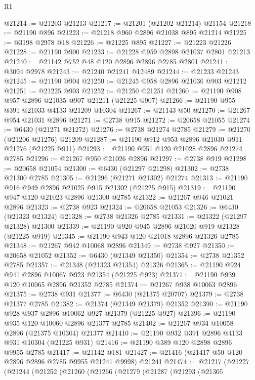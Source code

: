 \begin{lexlean}{R1}
\begin{coremodule}
@21214 := @21203 @21213
@21217 := @21201 (@21202 @21214) @21154
@21218 := @21190 @896
@21223 := @21218 @960 @2896 @21038 @895 @21214
@21225 := @3198 @2978 @18
@21226 := @21225 @895
@21227 := @21223 @21226
@21228 := @21190 @900
@21233 := @21228 @959 @2898 @21037 @2801 @21213
@21240 := @21142 @752 @48 @120 @2896 @2896 @2785 @2801
@21241 := @3094 @2978
@21243 := @21240 @21241 @12489
@21244 := @21233 @21243
@21245 := @21190 @904
@21250 := @21245 @958 @2896 @21036 @903 @21212
@21251 := @21225 @903
@21252 := @21250 @21251
@21260 := @21190 @908 @957 @2896 @21035 @907 @21211 (@21225 @907)
@21266 := @21190 @955 @391 @21033 @4133 @21209 @10304
@21267 := @21143 @50
@21270 := @21267 @954 @21031 @2896
@21271 := @2738 @915
@21272 := @20658 @21055
@21274 := @6430 (@21271 @21272)
@21276 := @2738 @21274 @2785
@21279 := @21270 (@21206 @21276) @21209
@21287 := @21190 @912 @953 @2896 @21030 @911 @21276 (@21225 @911)
@21293 := @21190 @951 @120 @21028 @2896 @21274 @2785
@21296 := @21267 @950 @21026 @2896
@21297 := @2738 @919
@21298 := @20658 @21054
@21300 := @6430 (@21297 @21298)
@21302 := @2738 @21300 @2785
@21305 := @21296 (@21271 @21302) @21274
@21313 := @21190 @916 @949 @2896 @21025 @915 @21302 (@21225 @915)
@21319 := @21190 @947 @120 @21023 @2896 @21300 @2785
@21322 := @21267 @946 @21021 @2896
@21323 := @2738 @923
@21324 := @20658 @21053
@21326 := @6430 (@21323 @21324)
@21328 := @2738 @21326 @2785
@21331 := @21322 (@21297 @21328) @21300
@21339 := @21190 @920 @945 @2896 @21020 @919 @21328 (@21225 @919)
@21345 := @21190 @943 @120 @21018 @2896 @21326 @2785
@21348 := @21267 @942 @10068 @2896
@21349 := @2738 @927
@21350 := @20658 @21052
@21352 := @6430 (@21349 @21350)
@21354 := @2738 @21352 @2785
@21357 := @21348 (@21323 @21354) @21326
@21365 := @21190 @924 @941 @2896 @10067 @923 @21354 (@21225 @923)
@21371 := @21190 @939 @120 @10065 @2896 @21352 @2785
@21374 := @21267 @938 @10063 @2896
@21375 := @2738 @931
@21377 := @6430 (@21375 @20707)
@21379 := @2738 @21377 @2785
@21382 := @21374 (@21349 @21379) @21352
@21390 := @21190 @928 @937 @2896 @10062 @927 @21379 (@21225 @927)
@21396 := @21190 @935 @120 @10060 @2896 @21377 @2785
@21402 := @21267 @934 @10058 @2896 (@21375 @10304) @21377
@21410 := @21190 @932 @391 @2896 @4133 @931 @10304 (@21225 @931)
@21416 := @21190 @389 @120 @2898 @2896 @9955 @2785
@21417 := @21142 @181
@21427 := @21416 (@21417 @50 @120 @2896 @2896 @2785 @9955 @21241 @9998) @21241
@21474 := @21217
    (@21227
      (@21244
        (@21252
          (@21260
            (@21266
              (@21279
                (@21287
                  (@21293
                    (@21305

\end{coremodule}
\end{lexlean}
